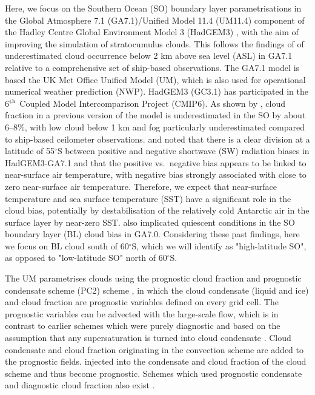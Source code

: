 Here, we focus on the Southern Ocean (SO) boundary layer parametrisations in the
Global Atmosphere 7.1 (GA7.1)/Unified Model 11.4 (UM11.4) component of the
Hadley Centre Global Environment Model 3 (HadGEM3) \citep{walters2019},
with the aim of improving the simulation of stratocumulus clouds.
This follows the findings of \cite{kuma2020a} of underestimated cloud occurrence
below 2 km above sea level (ASL) in GA7.1 relative to a comprehensive set of
ship-based observations.
The GA7.1 model is based the  UK Met Office
Unified Model (UM), which is also used for operational numerical weather
prediction (NWP). HadGEM3 (GC3.1) has participated in the 6$^{\rm th}$ Coupled
Model Intercomparison Project (CMIP6). As shown by \cite{kuma2020a}, cloud
fraction in a previous version of the model is underestimated in the SO by about 6--8\%, with low cloud below 1 km
and fog particularly underestimated compared to ship-based ceilometer
observations. \cite{schuddeboom2019} and \cite{kuma2020a} noted that there is a clear division at a latitude of 55$^\circ$S between positive and negative shortwave (SW) radiation biases in HadGEM3-GA7.1 and that the positive vs.~negative bias appears to be linked to near-surface air temperature, with negative bias strongly associated with
close to zero near-surface air temperature. Therefore, we expect that
near-surface temperature and sea surface temperature (SST) have a significant role in the cloud bias, potentially by destabilisation of the relatively cold Antarctic air in the surface
layer by near-zero SST. \cite{loveridge2019} also implicated quiescent conditions in the
SO boundary layer (BL) cloud bias in GA7.0. Considering these past findings, here we focus
on BL cloud south of 60$^\circ$S, which we will identify as
"high-latitude SO", as opposed to "low-latitude SO" north of 60$^\circ$S.

The UM parametrises clouds using the prognostic cloud fraction and prognostic condensate scheme (PC2) scheme
\citep{wilson2008a,wilson2008b}, in which the cloud condensate (liquid and ice)
and cloud fraction are prognostic variables defined on every grid cell. The prognostic variables can be advected with the
large-scale flow, which is in contrast to earlier schemes which were purely
diagnostic \citep{smith1990} and based on the assumption that any
supersaturation is turned into cloud condensate \citep{jakob2000}. Cloud
condensate and cloud fraction originating in the convection scheme are
added to the prognostic fields.
injected
into the condensate and cloud fraction of the cloud scheme and thus become
prognostic.
Schemes which
used prognostic condensate and diagnostic cloud fraction also exist
\citep{sundqvist1978,sundqvist1989}.

